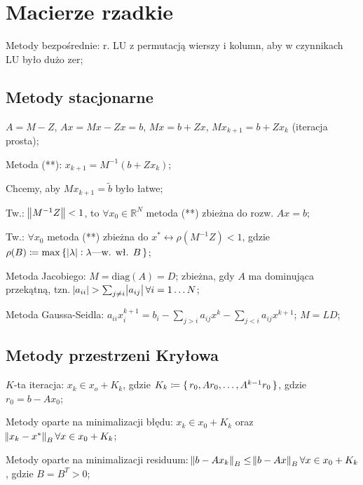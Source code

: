 \section{Macierze rzadkie}

\entry
Metody bezpośrednie: r. LU z permutacją wierszy i kolumn, aby w czynnikach LU było dużo zer;


\subsection{Metody stacjonarne}

\entry
$A=M-Z$, $Ax=Mx-Zx=b$, $Mx=b+Zx$, $Mx_{k+1}=b+Zx_{k}$ (iteracja prosta);

\entry
Metoda (**): $x_{k+1}=M^{-1}(b+Zx_k)$;

\entry
Chcemy, aby $Mx_{k+1}=\tilde{b}$ było łatwe;

\entry
Tw.: $\norm{M^{-1}Z} < 1$, to $\forall x_0 \in \mathbb{R}^N$ metoda (**) zbieżna do rozw. $Ax=b$;

\entry
Tw.: $\forall x_0$ metoda (**) zbieżna do $x^* \leftrightarrow \rho(M^{-1}Z) < 1$, gdzie $\rho(B) \coloneqq \max\set{\abs{\lambda} : \lambda\text{---w. wł. } B}$;

\entry
Metoda Jacobiego: $M=\mathrm{diag}(A) = D$; zbieżna, gdy $A$ ma dominująca przekątną, tzn. $\abs{a_{ii}} > \sum_{j\neq i}\abs{a_{ij}} \forall i=1\ldots N$;

\entry
Metoda Gaussa-Seidla: $a_{ii}x_i^{k+1}=b_i-\sum_{j>i}a_{ij}x^k-\sum_{j<i}a_{ij}x^{k+1}$; $M = LD$;

\subsection{Metody przestrzeni Kryłowa}

\entry
$K$-ta iteracja: $x_k\in x_o+K_k$, gdzie $K_k\coloneqq \set{r_0, Ar_0,\ldots, A^{k-1}r_0}$, gdzie $r_0=b-Ax_0$;

\entry
Metody oparte na minimalizacji błędu: $x_k\in x_0 +K_k$ oraz $\norm{x_k - x^*}_B \forall x\in x_0 + K_k$;

\entry
Metody oparte na minimalizacji residuum: $\norm{b-Ax_k}_B \leq \norm{b-Ax}_B \forall x\in x_0 +K_k$, gdzie $B=B^T>0$;


